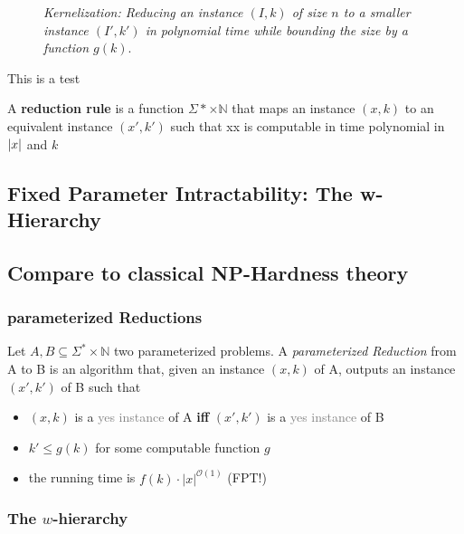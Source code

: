 \begin{figure}
    \centering
    
    \caption{\textit{Kernelization: Reducing an instance $(I,k)$ of size $n$ to a smaller instance $(I', k')$ in polynomial time while bounding the size by a function $g(k)$}.}
    \label{fig:kernelization}
\end{figure}

\begin{definition}
     This is a test
\end{definition}

A \textbf{reduction rule} is a function $\Sigma* \times \mathbb{N}$ that maps an instance $(x,k)$ to an equivalent instance $(x',k')$ such that xx is computable in time polynomial in $\abs{x}$ and $k$

\subsection{Fixed Parameter Intractability: The w-Hierarchy}
\subsection{Compare to classical NP-Hardness theory}

\subsubsection{parameterized Reductions}
\begin{definition} Let $A,B\subseteq \Sigma^*\times\mathbb{N}$ two parameterized problems. A \textit{parameterized Reduction} from A to B is an algorithm that, given an instance $(x,k)$ of A, outputs an instance $(x', k')$ of B such that

    \begin{itemize}
        \item $(x,k)$ is a \textcolor{gray}{yes instance} of A \textbf{iff} $(x',k')$ is a \textcolor{gray}{yes instance} of B
        \item $k' \leq g(k)$ for some computable function $g$
        \item the running time is $f(k)\cdot |x|^{\mathcal{O}(1)}$ (FPT!)
    \end{itemize}
\end{definition}
    \subsubsection{The $w$-hierarchy}

